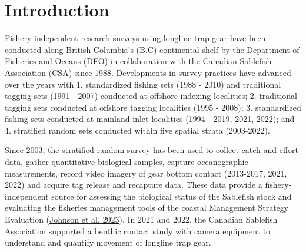 \documentclass[12pt]{article}\usepackage[]{graphicx}\usepackage[]{color}
\begin{document}

\frontmatter


\renewcommand{\headrulewidth}{0.5pt}  %
\renewcommand{\footrulewidth}{0.5pt}  %

\newcommand{\lt}{\ensuremath <}
\newcommand{\gt}{\ensuremath >}

\newlength{\cslhangindent}
\setlength{\cslhangindent}{1.5em}
\newenvironment{cslreferences}%
  {}%
  {\par}

\hypertarget{sec:introduction}{%
\section{Introduction}\label{sec:introduction}}

Fishery-independent research surveys using longline trap gear have been conducted along British Columbia's (B.C) continental shelf by the Department of Fisheries and Oceans (DFO) in collaboration with the Canadian Sablefish Association (CSA) since 1988. Developments in survey practices have advanced over the years with 1. standardized fishing sets (1988 - 2010) and traditional tagging sets (1991 - 2007) conducted at offshore indexing localities; 2. traditional tagging sets conducted at offshore tagging localities (1995 - 2008); 3. standardized fishing sets conducted at mainland inlet localities (1994 - 2019, 2021, 2022); and 4. stratified random sets conducted within five spatial strata (2003-2022).

Since 2003, the stratified random survey has been used to collect catch and effort data, gather quantitative biological samples, capture oceanographic measurements, record video imagery of gear bottom contact (2013-2017, 2021, 2022) and acquire tag release and recapture data. These data provide a fishery-independent source for assessing the biological status of the Sablefish stock and evaluating the fisheries management tools of the coastal Management Strategy Evaluation (\protect\hyperlink{ref-Johnson2023}{Johnson et al. 2023}). In 2021 and 2022, the Canadian Sablefish Association supported a benthic contact study with camera equipment to understand and quantify movement of longline trap gear.
\end{document}
